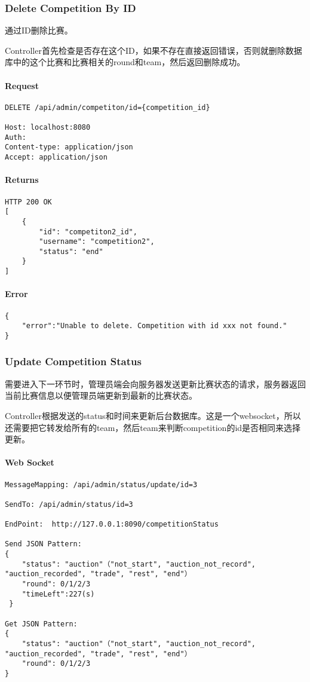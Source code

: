 \documentclass{article}
\begin{document}
\subsubsection{Delete Competition By ID}

通过ID删除比赛。

Controller首先检查是否存在这个ID，如果不存在直接返回错误，否则就删除数据库中的这个比赛和比赛相关的round和team，然后返回删除成功。

\paragraph*{Request}
\begin{lstlisting}
DELETE /api/admin/competiton/id={competition_id}

Host: localhost:8080
Auth:
Content-type: application/json
Accept: application/json
\end{lstlisting}

\paragraph*{Returns}
\begin{lstlisting}
HTTP 200 OK
[
    {
        "id": "competiton2_id",
        "username": "competition2",
        "status": "end"
    }
]
\end{lstlisting}

\paragraph*{Error}
\begin{lstlisting}
{
    "error":"Unable to delete. Competition with id xxx not found."
}
\end{lstlisting}

\subsubsection{Update Competition Status}

需要进入下一环节时，管理员端会向服务器发送更新比赛状态的请求，服务器返回当前比赛信息以便管理员端更新到最新的比赛状态。

Controller根据发送的status和时间来更新后台数据库。这是一个websocket，所以还需要把它转发给所有的team，然后team来判断competition的id是否相同来选择更新。

\paragraph*{Web Socket}
\begin{lstlisting}
MessageMapping: /api/admin/status/update/id=3

SendTo: /api/admin/status/id=3

EndPoint:  http://127.0.0.1:8090/competitionStatus

Send JSON Pattern:
{
    "status": "auction"（"not_start", "auction_not_record", "auction_recorded", "trade", "rest", "end"）
    "round": 0/1/2/3
    "timeLeft":227(s)
 }

Get JSON Pattern:
{
    "status": "auction"（"not_start", "auction_not_record", "auction_recorded", "trade", "rest", "end"）
    "round": 0/1/2/3
}
\end{lstlisting}
\end{document}
